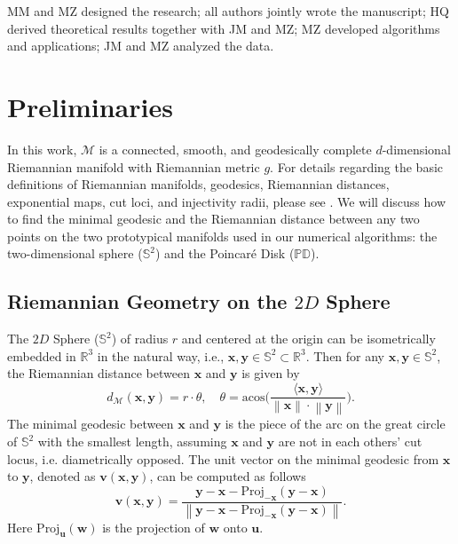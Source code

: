 \documentclass[11pt]{article}
\newcommand{\mbf}[1]{\boldsymbol{#1}}
\newcommand{\inprod}[1]{\langle #1 \rangle}
\newcommand{\norm}[1]{\left\| #1 \right\|}
\newcommand{\R}{\mathbb{R}}
\newcommand{\bu}{\mbf{u}}
\newcommand{\bv}{\mbf{v}}
\newcommand{\bw}{\mbf{w}}
\newcommand{\bx}{\mbf{x}}
\newcommand{\by}{\mbf{y}}
\newcommand{\mM}{\mathcal{M}}
\newcommand{\sdim}{d} %
\begin{document}
MM and MZ designed the research; all authors jointly wrote the manuscript; HQ derived theoretical results together with JM and MZ; MZ developed algorithms and applications; JM and MZ analyzed the data.
%
\appendix
%
\section{Preliminaries}\label{sec:manifold}
%
In this work, $\mM$ is a connected, smooth, and geodesically complete $\sdim$-dimensional Riemannian manifold with Riemannian metric $g$.  For details regarding the basic definitions of Riemannian manifolds, geodesics, Riemannian distances, exponential maps, cut loci, and injectivity radii, please see \cite{Lee2003, docarmo1976}.  We will discuss how to find the minimal geodesic and the Riemannian distance between any two points on the two prototypical manifolds used in our numerical algorithms: the two-dimensional sphere ($\mathbb{S}^2$) and the Poincar\'{e} Disk ($\mathbb{PD}$).
%
\subsection{Riemannian Geometry on the $2D$ Sphere}
%
The $2D$ Sphere ($\mathbb{S}^2$) of radius $r$ and centered at the origin can be isometrically embedded in $\R^3$ in the natural way, i.e., $\bx, \by \in \mathbb{S}^2 \subset \R^3$.  Then for any $\bx, \by \in \mathbb{S}^2$, the Riemannian distance between $\bx$ and $\by$ is given by
\[
d_{\mM}(\bx, \by) = r\cdot\theta, \quad \theta = \text{acos} \bigg(\frac{\inprod{\bx, \by}}{\norm{\bx}\cdot\norm{\by}}\bigg).
\]
The minimal geodesic between $\bx$ and $\by$ is the piece of the arc on the great circle of $\mathbb{S}^2$ with the smallest length, assuming $\bx$ and $\by$ are not in each others' cut locus, i.e. diametrically opposed.  The unit vector on the minimal geodesic from $\bx$ to $\by$, denoted as $\bv(\bx, \by)$, can be computed as follows
\[
\bv(\bx, \by) = \frac{\by - \bx - \text{Proj}_{-\bx}(\by - \bx)}{\norm{\by - \bx - \text{Proj}_{-\bx}(\by - \bx)}}.
\]
Here $\text{Proj}_{\bu}(\bw)$ is the projection of $\bw$ onto $\bu$.  
%
\end{document}
